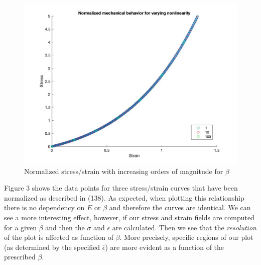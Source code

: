 \documentclass[12pt,american]{article}
\def\beq{\begin{equation}}
\def\eeq{\end{equation}}
\def\bea{\begin{eqnarray}}
\def\eea{\end{eqnarray}}
\def \ep{\epsilon}
\def \barsig{\mbox{{$\overline\sigma$}}}
\def \barep{\mbox{{$\overline{\ep}$}}}
\begin{document}
\begin{figure}
    \begin{center}
	\includegraphics[width= 12cm]{beta-scaling.jpg}
	\caption{Normalized stress/strain with increasing orders of magnitude for $\beta$}
	\end{center}
\end{figure}

\medskip

Figure 3 shows the data points for three stress/strain curves that have been normalized as described in (138). As expected, when plotting this relationship there is no dependency on $E$ or $\beta$ and therefore the curves are identical. We can see a more interesting effect, however, if our stress and strain fields are computed for a given $\beta$ and then the $\barsig$ and $\barep$ are calculated. Then we see that the \emph{resolution} of the plot is affected as function of $\beta$. More precisely, specific regions of our plot (as determined by the specified $\barep$) are more evident as a function of the prescribed $\beta$.



%
\end{document}
